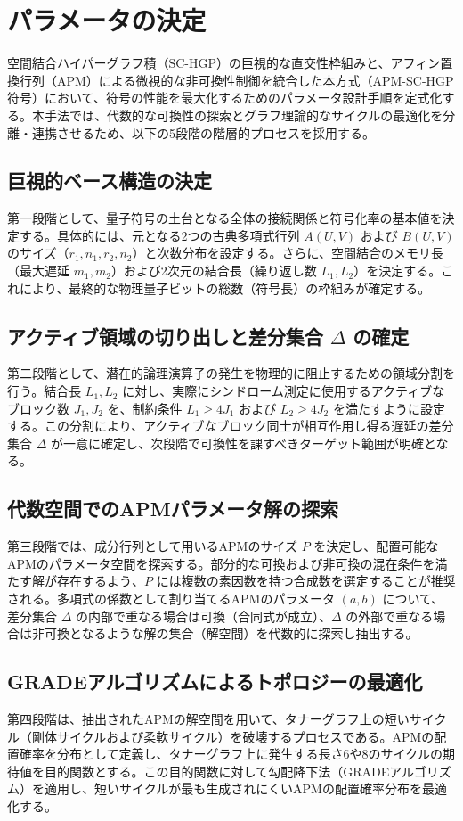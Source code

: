 \documentclass[12pt]{article}
\begin{document}
\section{パラメータの決定}

空間結合ハイパーグラフ積（SC-HGP）の巨視的な直交性枠組みと、アフィン置換行列（APM）による微視的な非可換性制御を統合した本方式（APM-SC-HGP符号）において、符号の性能を最大化するためのパラメータ設計手順を定式化する。本手法では、代数的な可換性の探索とグラフ理論的なサイクルの最適化を分離・連携させるため、以下の5段階の階層的プロセスを採用する。

\subsection{巨視的ベース構造の決定}
第一段階として、量子符号の土台となる全体の接続関係と符号化率の基本値を決定する。具体的には、元となる2つの古典多項式行列 $A(U,V)$ および $B(U,V)$ のサイズ（$r_1, n_1, r_2, n_2$）と次数分布を設定する。さらに、空間結合のメモリ長（最大遅延 $m_1, m_2$）および2次元の結合長（繰り返し数 $L_1, L_2$）を決定する。これにより、最終的な物理量子ビットの総数（符号長）の枠組みが確定する。

\subsection{アクティブ領域の切り出しと差分集合 $\Delta$ の確定}
第二段階として、潜在的論理演算子の発生を物理的に阻止するための領域分割を行う。結合長 $L_1, L_2$ に対し、実際にシンドローム測定に使用するアクティブなブロック数 $J_1, J_2$ を、制約条件 $L_1 \ge 4J_1$ および $L_2 \ge 4J_2$ を満たすように設定する。この分割により、アクティブなブロック同士が相互作用し得る遅延の差分集合 $\Delta$ が一意に確定し、次段階で可換性を課すべきターゲット範囲が明確となる。

\subsection{代数空間でのAPMパラメータ解の探索}
第三段階では、成分行列として用いるAPMのサイズ $P$ を決定し、配置可能なAPMのパラメータ空間を探索する。部分的な可換および非可換の混在条件を満たす解が存在するよう、$P$ には複数の素因数を持つ合成数を選定することが推奨される。多項式の係数として割り当てるAPMのパラメータ $(a, b)$ について、差分集合 $\Delta$ の内部で重なる場合は可換（合同式が成立）、$\Delta$ の外部で重なる場合は非可換となるような解の集合（解空間）を代数的に探索し抽出する。

\subsection{GRADEアルゴリズムによるトポロジーの最適化}
第四段階は、抽出されたAPMの解空間を用いて、タナーグラフ上の短いサイクル（剛体サイクルおよび柔軟サイクル）を破壊するプロセスである。APMの配置確率を分布として定義し、タナーグラフ上に発生する長さ6や8のサイクルの期待値を目的関数とする。この目的関数に対して勾配降下法（GRADEアルゴリズム）を適用し、短いサイクルが最も生成されにくいAPMの配置確率分布を最適化する。
\end{document}
